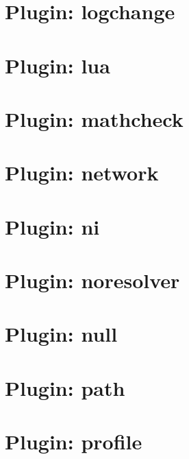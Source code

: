 \documentclass[twoside]{book}
\newcommand{\+}{\discretionary{\mbox{\scriptsize$\hookleftarrow$}}{}{}}
\begin{document}
\chapter{Plugin\+: logchange}
\label{md_src_plugins_logchange_README}
\hypertarget{md_src_plugins_logchange_README}{}

\chapter{Plugin\+: lua}
\label{md_src_plugins_lua_README}
\hypertarget{md_src_plugins_lua_README}{}

\chapter{Plugin\+: mathcheck}
\label{md_src_plugins_mathcheck_README}
\hypertarget{md_src_plugins_mathcheck_README}{}

\chapter{Plugin\+: network}
\label{md_src_plugins_network_README}
\hypertarget{md_src_plugins_network_README}{}

\chapter{Plugin\+: ni}
\label{md_src_plugins_ni_README}
\hypertarget{md_src_plugins_ni_README}{}

\chapter{Plugin\+: noresolver}
\label{md_src_plugins_noresolver_README}
\hypertarget{md_src_plugins_noresolver_README}{}

\chapter{Plugin\+: null}
\label{md_src_plugins_null_README}
\hypertarget{md_src_plugins_null_README}{}

\chapter{Plugin\+: path}
\label{md_src_plugins_path_README}
\hypertarget{md_src_plugins_path_README}{}

\chapter{Plugin\+: profile}
\label{md_src_plugins_profile_README}
\hypertarget{md_src_plugins_profile_README}{}

\end{document}
